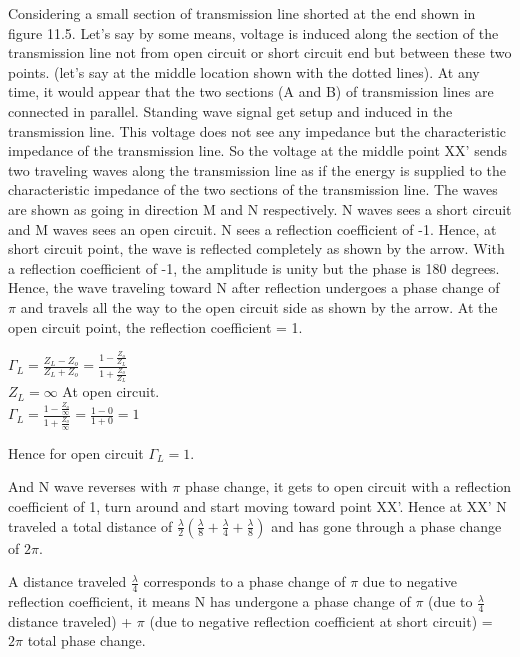 Considering a small section of transmission line shorted at the end shown in figure 11.5. Let's say  by some  means,  voltage  is induced along the section of the  transmission line not from open circuit  or short circuit  end  but between  these  two  points. (let's say at the middle location shown  with  the dotted lines). At any time, it would appear that the two sections (A and B) of transmission lines are connected in parallel. Standing wave signal get setup and induced in the transmission line. This voltage does not see any impedance but the characteristic impedance of the transmission line. So the voltage  at the middle  point XX' sends two traveling waves along the transmission line as if the  energy is supplied to the characteristic impedance of the two sections of the transmission line. The waves are shown  as going in direction M and N respectively. N waves  sees a short circuit and M waves  sees  an open circuit. N sees a reflection  coefficient  of -1. Hence, at short circuit point, the wave is reflected completely as shown  by the arrow. With a reflection coefficient of -1, the amplitude is unity but the phase is 180 degrees. Hence, the wave  traveling toward N after reflection undergoes a phase change of $\pi$ and travels all the way to the open circuit  side as shown by the arrow. At the open circuit point, the reflection coefficient = 1.

$ \Gamma_{L} = \frac{Z_{L} - Z_{o}}{Z_{L} + Z_{o}} =  \frac{1 - \frac{Z_{o}}{Z_{L}}}{1 + \frac{Z_{o}}{Z_{L}}}$\\

$ Z_{L} = \infty $ At open circuit.\\

$ \Gamma_{L} =  \frac{1 - \frac{Z_{o}}\infty}{1 + \frac{Z_{o}}\infty} = \frac{1 - 0}{1 + 0} = 1$

Hence for open circuit $\Gamma_{L} = 1 $.

And N wave reverses with $\pi$ phase change, it gets to open circuit with a reflection coefficient of  1, turn around and start moving  toward point XX'. Hence at XX' N traveled  a total distance of $ \frac{\lambda}{2} (\frac{\lambda}{8} + \frac{\lambda}{4} + \frac{\lambda}{8})$ and has  gone through a phase change of $2\pi$.

A distance traveled $\frac{\lambda}{4}$ corresponds to a phase change  of $\pi$ due to negative reflection coefficient, it means N has undergone a phase change of $\pi$  (due to $\frac{\lambda }{4}$ distance  traveled) + $\pi$ (due to negative  reflection  coefficient  at short circuit) = $2\pi$ total phase change.

